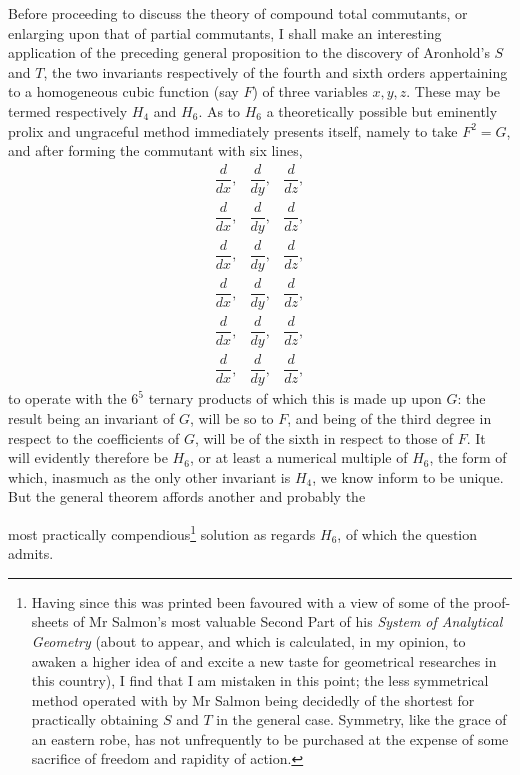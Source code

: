 \documentclass[11pt]{article}
\newcommand{\sourcepage}[1]{\marginpar{\scriptsize p.~#1}}
\begin{document}
{{Before proceeding to discuss the theory of compound total commutants, or enlarging upon that of partial commutants, I shall make an interesting application of the preceding general proposition to the discovery of Aronhold's $S$ and $T$, the two invariants respectively of the fourth and sixth orders appertaining to a homogeneous cubic function (say $F$) of three variables $x,y,z$. These may be termed respectively $H_4$ and $H_6$. As to $H_6$ a theoretically possible but eminently prolix and ungraceful method immediately presents itself, namely to take $F^2=G$, and after forming the commutant with six lines,
\[
\begin{array}{ccc}
\dfrac{d}{dx},&\dfrac{d}{dy},&\dfrac{d}{dz},\\[0.5em]
\dfrac{d}{dx},&\dfrac{d}{dy},&\dfrac{d}{dz},\\[0.5em]
\dfrac{d}{dx},&\dfrac{d}{dy},&\dfrac{d}{dz},\\[0.5em]
\dfrac{d}{dx},&\dfrac{d}{dy},&\dfrac{d}{dz},\\[0.5em]
\dfrac{d}{dx},&\dfrac{d}{dy},&\dfrac{d}{dz},\\[0.5em]
\dfrac{d}{dx},&\dfrac{d}{dy},&\dfrac{d}{dz},
\end{array}
\]
to operate with the $6^5$ ternary products of which this is made up upon $G$: the result being an invariant of $G$, will be so to $F$, and being of the third degree in respect to the coefficients of $G$, will be of the sixth in respect to those of $F$. It will evidently therefore be $H_6$, or at least a numerical multiple of $H_6$, the form of which, inasmuch as the only other invariant is $H_4$, we know inform to be unique. But the general theorem affords another and probably the

\sourcepage{309}
most practically compendious\footnote{Having since this was printed been favoured with a view of some of the proof-sheets of Mr Salmon's most valuable Second Part of his \emph{System of Analytical Geometry} (about to appear, and which is calculated, in my opinion, to awaken a higher idea of and excite a new taste for geometrical researches in this country), I find that I am mistaken in this point; the less symmetrical method operated with by Mr Salmon being decidedly of the shortest for practically obtaining $S$ and $T$ in the general case. Symmetry, like the grace of an eastern robe, has not unfrequently to be purchased at the expense of some sacrifice of freedom and rapidity of action.} solution as regards $H_6$, of which the question admits.

}}
\end{document}
